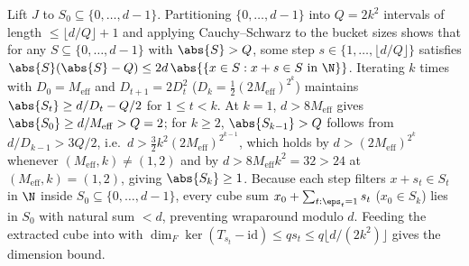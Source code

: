 \begin{outline}
Lift $J$ to $S_0 \subseteq \{0,\dots,d-1\}$. Partitioning $\{0,\dots,d-1\}$ into $Q = 2k^2$ intervals
of length $\le \lfloor d/Q\rfloor + 1$ and applying Cauchy--Schwarz to the bucket sizes shows that for
any $S \subseteq \{0,\dots,d-1\}$ with $\abs{S} > Q$, some step $s \in \{1, \dots, \lfloor d/Q\rfloor\}$
satisfies $\abs{S}(\abs{S} - Q) \le 2d\,\abs{\{x \in S : x + s \in S \text{ in }\N\}}$. Iterating $k$
times with $D_0 = M_{\mathrm{eff}}$ and $D_{t+1} = 2 D_t^2$ ($D_k = \frac{1}{2}(2 M_{\mathrm{eff}})^{2^k}$)
maintains $\abs{S_t} \ge d/D_t - Q/2$ for $1 \le t < k$. At $k = 1$, $d > 8 M_{\mathrm{eff}}$ gives
$\abs{S_0} \ge d/M_{\mathrm{eff}} > Q = 2$; for $k \ge 2$, $\abs{S_{k-1}} > Q$ follows from
$d/D_{k-1} > 3Q/2$, i.e.\ $d > \frac{3}{2}k^2(2M_{\mathrm{eff}})^{2^{k-1}}$, which holds by
$d > (2M_{\mathrm{eff}})^{2^k}$ whenever $(M_{\mathrm{eff}}, k) \ne (1, 2)$ and by
$d > 8 M_{\mathrm{eff}} k^2 = 32 > 24$ at $(M_{\mathrm{eff}}, k) = (1, 2)$, giving $\abs{S_k} \ge 1$.
Because each step filters $x + s_t \in S_t$ in $\N$ inside
$S_0 \subseteq \{0,\dots,d-1\}$, every cube sum $x_0 + \sum_{t : \eps_t = 1} s_t$ ($x_0 \in S_k$) lies
in $S_0$ with natural sum $< d$, preventing wraparound modulo $d$. Feeding the extracted cube into
 with $\dim_F\ker(T_{s_t} - \mathrm{id}) \le q s_t \le q\lfloor d/(2k^2)\rfloor$
gives the dimension bound.
\end{outline}

